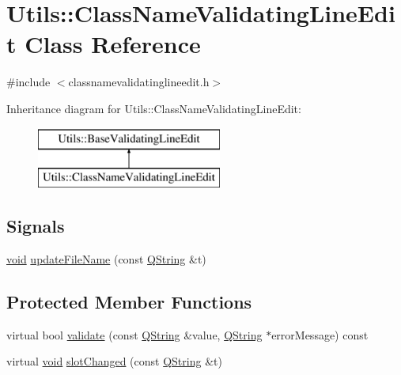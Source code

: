 \hypertarget{class_utils_1_1_class_name_validating_line_edit}{\section{\-Utils\-:\-:\-Class\-Name\-Validating\-Line\-Edit \-Class \-Reference}
\label{class_utils_1_1_class_name_validating_line_edit}
}


{\ttfamily \#include $<$classnamevalidatinglineedit.\-h$>$}

\-Inheritance diagram for \-Utils\-:\-:\-Class\-Name\-Validating\-Line\-Edit\-:\begin{figure}[H]
\begin{center}
\leavevmode
\includegraphics[height=2.000000cm]{class_utils_1_1_class_name_validating_line_edit}
\end{center}
\end{figure}
\subsection*{\-Signals}
\begin{DoxyCompactItemize}
\item 
\hyperlink{group___u_a_v_objects_plugin_ga444cf2ff3f0ecbe028adce838d373f5c}{void} \hyperlink{class_utils_1_1_class_name_validating_line_edit_a61f9408be184ce1f403c4b75b7d36c06}{update\-File\-Name} (const \hyperlink{group___u_a_v_objects_plugin_gab9d252f49c333c94a72f97ce3105a32d}{\-Q\-String} \&t)
\end{DoxyCompactItemize}
\subsection*{\-Protected \-Member \-Functions}
\begin{DoxyCompactItemize}
\item 
virtual bool \hyperlink{class_utils_1_1_class_name_validating_line_edit_ac58e9df4310d647fb83e92d82ffa53a1}{validate} (const \hyperlink{group___u_a_v_objects_plugin_gab9d252f49c333c94a72f97ce3105a32d}{\-Q\-String} \&value, \hyperlink{group___u_a_v_objects_plugin_gab9d252f49c333c94a72f97ce3105a32d}{\-Q\-String} $\ast$error\-Message) const 
\item 
virtual \hyperlink{group___u_a_v_objects_plugin_ga444cf2ff3f0ecbe028adce838d373f5c}{void} \hyperlink{class_utils_1_1_class_name_validating_line_edit_ae688632f3e52f39969a7cdae84ee288b}{slot\-Changed} (const \hyperlink{group___u_a_v_objects_plugin_gab9d252f49c333c94a72f97ce3105a32d}{\-Q\-String} \&t)
\end{DoxyCompactItemize}


